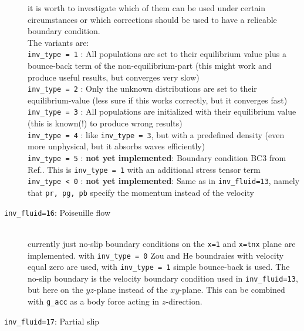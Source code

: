 \documentclass[a4paper]{article}
\begin{document}
\begin{description}
                it is worth to investigate which of them can be used under certain
                circumstances or which corrections should be used to have a relieable
                boundary condition. \\
                The variants are: \\
           {\tt inv\_type = 1} : All populations are set to their equilibrium value plus
                       a bounce-back term of the non-equilibrium-part (this might work
                       and produce useful results, but converges very slow)\\
           {\tt inv\_type = 2} : Only the unknown distributions are set to their 
                       equilibrium-value (less sure if this works correctly, 
                       but it converges fast)\\
           {\tt inv\_type = 3} : All populations are initialized with their equilibrium
                              value 
                              (this is known(!) to produce wrong results\cite{bib:Latt})\\
           {\tt inv\_type = 4} : like {\tt inv\_type = 3}, but with a predefined density
                              (even more unphysical, but it absorbs waves efficiently)\\
           {\tt inv\_type = 5} : {\bf not yet implemented}: Boundary condition BC3
                                 from Ref.\cite{bib:Latt}. This is {\tt inv\_type = 1}
                                 with an additional stress tensor term\\
           {\tt inv\_type < 0} : {\bf not yet implemented}: Same as in  
                     {\tt inv\_fluid=13}, namely that {\tt pr, pg, pb} specify 
                     the momentum instead of the velocity
        \item[{\tt inv\_fluid=16}: Poiseuille flow]\ \\
                currently just no-slip boundary
                conditions on the {\tt x=1} and {\tt x=tnx} plane are implemented. 
                with {\tt inv\_type = 0} Zou and He boundraies with velocity equal zero
                are used, with {\tt inv\_type = 1} simple bounce-back is used.
                The no-slip boundary is the velocity boundary condition used in 
                {\tt inv\_fluid=13}, but here on the $yz$-plane instead of the $xy$-plane.
                This can be combined with {\tt g\_acc} as a body force acting in 
                $z$-direction.
        \item[{\tt inv\_fluid=17}: Partial slip]\ \\

\end{description}
\end{document}

